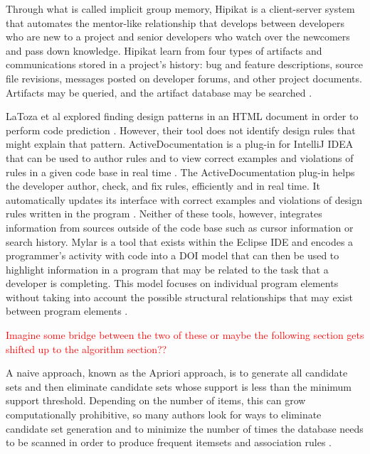 \documentclass[12pt]{article}
\newcommand{\tcr}{\textcolor{red}}
\begin{document}
Through what is called implicit group memory, Hipikat is a client-server system that automates the mentor-like relationship that develops between developers who are new to a project and senior developers who watch over the newcomers and pass down knowledge. Hipikat learn from four types of artifacts and communications stored in a project's history: bug and feature descriptions, source file revisions, messages posted on developer forums, and other project documents. Artifacts may be queried, and the artifact database may be searched \cite{CubranicMurphy2003}.

LaToza et al explored finding design patterns in an HTML document in order to perform code prediction \cite{LaTozaEtAl2019}. However, their tool does not identify design rules that might explain that pattern. 
ActiveDocumentation is a plug-in for IntelliJ IDEA that can be used to author rules and to view correct examples and violations of rules in a given code base in real time \cite{MehrpurEtAl2019}. The ActiveDocumentation plug-in helps the developer author, check, and fix rules, efficiently and in real time. It automatically updates its interface with correct examples and violations of design rules written in the program \cite{MehrpurEtAl2019}. Neither of these tools, however, integrates information from sources outside of the code base such as cursor information or search history. Mylar is a tool that exists within the Eclipse IDE and encodes a programmer's activity with code into a DOI model that can then be used to highlight information in a program that may be related to the task that a developer is completing. This model focuses on individual program elements without taking into account the possible structural relationships that may exist between program elements \cite{KerstenMurphy2005}.

\bigskip

\tcr{Imagine some bridge between the two of these or maybe the following section gets shifted up to the algorithm section??}

A naive approach, known as the Apriori approach, is to generate all candidate sets and then eliminate candidate sets whose support is less than the minimum support threshold. Depending on the number of  items, this can grow computationally prohibitive, so many authors look for ways to eliminate candidate set generation and to minimize the number of times the database needs to be scanned in order to produce frequent itemsets and association rules \cite{NarvekarSyed2015, WeiEtAl2014, EzeifeSu2002, LiEtAl2006}. 
\end{document}

